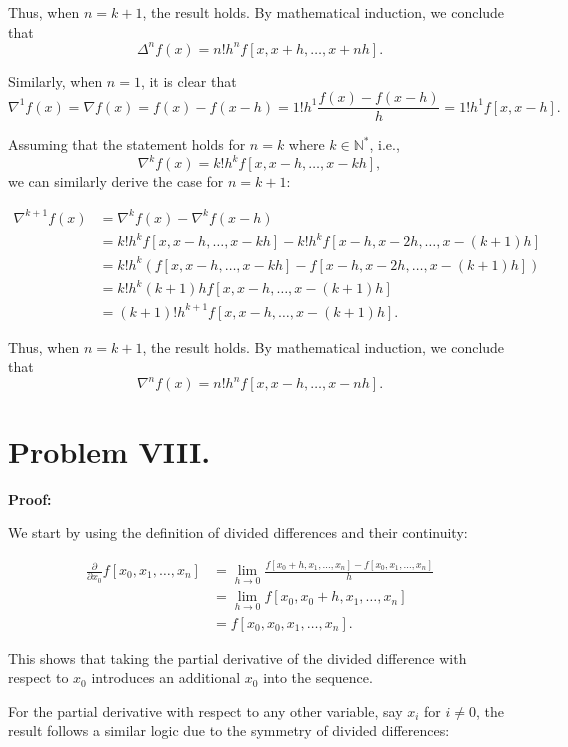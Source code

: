 \documentclass[a4paper, 12pt]{article}
\renewcommand{\qed}{\hfill \boxed{\mathbb{Q.E.D.}}}
\begin{document}
Thus, when \( n=k+1 \), the result holds. By mathematical induction, we conclude that 
\[
\Delta^n f(x) = n! h^n f[x, x+h, \ldots, x+nh].
\]

Similarly, when \( n=1 \), it is clear that 
\[
\nabla^1 f(x) = \nabla f(x) = f(x) - f(x-h) = 1! h^1 \frac{f(x) - f(x-h)}{h} = 1! h^1 f[x, x-h].
\]

Assuming that the statement holds for \( n=k \) where \( k \in \mathbb{N}^* \), i.e., 
\[
\nabla^k f(x) = k! h^k f[x, x-h, \ldots, x-kh],
\]
we can similarly derive the case for \( n=k+1 \):

\[
\begin{aligned}
\nabla^{k+1} f(x) & = \nabla^k f(x) - \nabla^k f(x-h) \\
& = k! h^k f[x, x-h, \ldots, x-kh] - k! h^k f[x-h, x-2h, \ldots, x-(k+1)h] \\
& = k! h^k \left( f[x, x-h, \ldots, x-kh] - f[x-h, x-2h, \ldots, x-(k+1)h] \right) \\
& = k! h^k (k+1) h f[x, x-h, \ldots, x-(k+1)h] \\
& = (k+1)! h^{k+1} f[x, x-h, \ldots, x-(k+1)h].
\end{aligned}
\]

Thus, when \( n=k+1 \), the result holds. By mathematical induction, we conclude that 
\[
\nabla^n f(x) = n! h^n f[x, x-h, \ldots, x-nh].
\]

\qed


\section*{Problem VIII.}

\textbf{Proof:}

We start by using the definition of divided differences and their continuity:

\[
\begin{aligned}
    \frac{\partial}{\partial x_0} f[x_0, x_1, \dots, x_n] &= \lim_{h \to 0} \frac{f[x_0 + h, x_1, \dots, x_n] - f[x_0, x_1, \dots, x_n]}{h} \\
    &= \lim_{h \to 0} f[x_0, x_0 + h, x_1, \dots, x_n] \\
    &= f[x_0, x_0, x_1, \dots, x_n].
\end{aligned}
\]

This shows that taking the partial derivative of the divided difference with respect to \(x_0\) introduces an additional \(x_0\) into the sequence.

For the partial derivative with respect to any other variable, say \(x_i\) for \(i \neq 0\), the result follows a similar logic due to the symmetry of divided differences:
\end{document}
